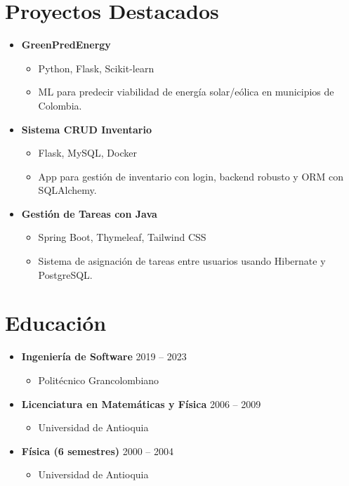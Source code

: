 \documentclass[a4paper,10pt]{article}
\begin{document}
	\section*{Proyectos Destacados}
	\begin{itemize}[leftmargin=*]
		\item \textbf{GreenPredEnergy}
		\begin{itemize}
			\item Python, Flask, Scikit-learn
			\item ML para predecir viabilidad de energía solar/eólica en municipios de Colombia.
		\end{itemize}
		\item \textbf{Sistema CRUD Inventario}
		\begin{itemize}
			\item Flask, MySQL, Docker
			\item App para gestión de inventario con login, backend robusto y ORM con SQLAlchemy.
		\end{itemize}
		\item \textbf{Gestión de Tareas con Java}
		\begin{itemize}
			\item Spring Boot, Thymeleaf, Tailwind CSS
			\item Sistema de asignación de tareas entre usuarios usando Hibernate y PostgreSQL.
		\end{itemize}
	\end{itemize}
	
	\section*{Educación}
	\begin{itemize}[leftmargin=*]
		\item \textbf{Ingeniería de Software} \hfill 2019 – 2023
		\begin{itemize}
			\item Politécnico Grancolombiano
		\end{itemize}
		\item \textbf{Licenciatura en Matemáticas y Física} \hfill 2006 – 2009
		\begin{itemize}
			\item Universidad de Antioquia
		\end{itemize}
		\item \textbf{Física (6 semestres)} \hfill 2000 – 2004
		\begin{itemize}
			\item Universidad de Antioquia
		\end{itemize}
	\end{itemize}
	
\end{document}
